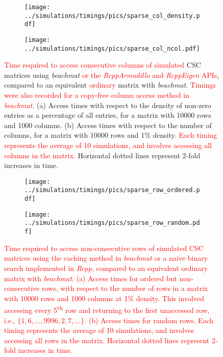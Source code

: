 \documentclass{article}
\newcommand{\beachmat}{\textit{beachmat}}
\newcommand{\revised}[1]{\textcolor{red}{#1}}
\begin{document}
\begin{figure}[bt]
    \centering
    \begin{subfigure}[b]{0.49\textwidth}
        \texttt{[image: ../simulations/timings/pics/sparse\_col\_density.pdf]}
        \caption{}
    \end{subfigure}
    \begin{subfigure}[b]{0.49\textwidth}
        \texttt{[image: ../simulations/timings/pics/sparse\_col\_ncol.pdf]}
        \caption{}
    \end{subfigure}
    \caption{\revised{Time required to access consecutive columns of simulated} CSC matrices using \beachmat{} \revised{or the \textit{RcppArmadillo} and \textit{RcppEigen} APIs}, compared to an equivalent \revised{ordinary} matrix with \beachmat{}.
        \revised{Timings were also recorded for a copy-free column access method in \beachmat{}.}
        (a) Access times with respect to the density of non-zero entries as a percentage of all entries, for a matrix with 10000 rows and 1000 columns.
        (b) Access times with respect to the number of columns, for a matrix with 10000 rows and 1\% density.
        \revised{Each timing represents the average of 10 simulations, and involves accessing all columns in the matrix.}
        Horizontal dotted lines represent 2-fold increases in time.
    }
    \label{fig:sparsecol}
\end{figure}

\begin{figure}[bt]
    \centering
    \begin{subfigure}[b]{0.49\textwidth}
        \texttt{[image: ../simulations/timings/pics/sparse\_row\_ordered.pdf]}
        \caption{}
    \end{subfigure}
    \begin{subfigure}[b]{0.49\textwidth}
        \texttt{[image: ../simulations/timings/pics/sparse\_row\_random.pdf]}
        \caption{}
    \end{subfigure}
    \caption{\revised{Time required to access non-consecutive rows of simulated CSC matrices using the caching method in \beachmat{} or a naive binary search implemented in \textit{Rcpp}, compared to an equivalent \revised{ordinary} matrix with \beachmat{}.
        (a) Access times for ordered but non-consecutive rows, with respect to the number of rows in a matrix with 10000 rows and 1000 columns at 1\% density.
        This involved accessing every 5\textsuperscript{th} row and returning to the first unaccessed row, i.e., $\{1, 6, \ldots, 9996, 2, 7, \ldots\}$.
        (b) Access times for random rows.
        Each timing represents the average of 10 simulations, and involves accessing all rows in the matrix.
Horizontal dotted lines represent 2-fold increases in time.}}
    \label{fig:sparserowrandom}
\end{figure}
\end{document}
